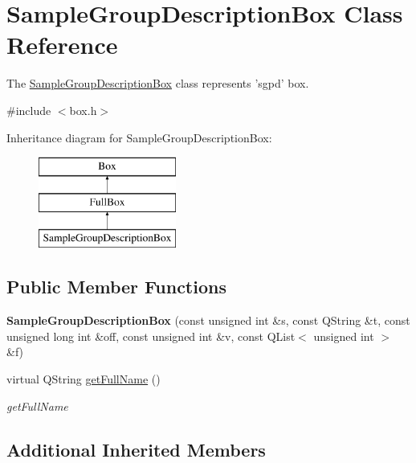 \hypertarget{class_sample_group_description_box}{\section{Sample\-Group\-Description\-Box Class Reference}
\label{class_sample_group_description_box}
}


The \hyperlink{class_sample_group_description_box}{Sample\-Group\-Description\-Box} class represents 'sgpd' box.  




{\ttfamily \#include $<$box.\-h$>$}

Inheritance diagram for Sample\-Group\-Description\-Box\-:\begin{figure}[H]
\begin{center}
\leavevmode
\includegraphics[height=3.000000cm]{class_sample_group_description_box}
\end{center}
\end{figure}
\subsection*{Public Member Functions}
\begin{DoxyCompactItemize}
\item 
\hypertarget{class_sample_group_description_box_acdce66c37161c4fa8f0419e98fc53f50}{{\bfseries Sample\-Group\-Description\-Box} (const unsigned int \&s, const Q\-String \&t, const unsigned long int \&off, const unsigned int \&v, const Q\-List$<$ unsigned int $>$ \&f)}\label{class_sample_group_description_box_acdce66c37161c4fa8f0419e98fc53f50}

\item 
virtual Q\-String \hyperlink{class_sample_group_description_box_a987897d30768742d06d40a4148c7c2ea}{get\-Full\-Name} ()
\begin{DoxyCompactList}\small\item\em get\-Full\-Name \end{DoxyCompactList}\end{DoxyCompactItemize}
\subsection*{Additional Inherited Members}



